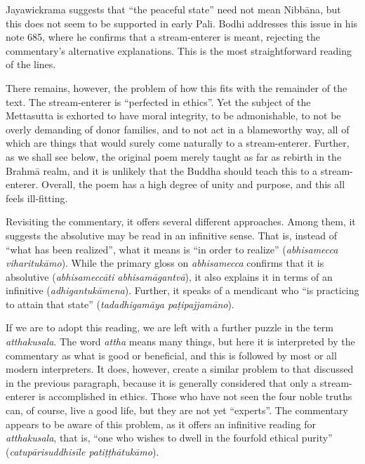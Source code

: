 \documentclass[12pt,openany]{book}%
\begin{document}
Jayawickrama suggests that “the peaceful state” need not mean \textsanskrit{Nibbāna}, but this does not seem to be supported in early Pali. Bodhi addresses this issue in his note 685, where he confirms that a stream-enterer is meant, rejecting the commentary’s alternative explanations. This is the most straightforward reading of the lines.

There remains, however, the problem of how this fits with the remainder of the text. The stream-enterer is “perfected in ethics”. Yet the subject of the Mettasutta is exhorted to have moral integrity, to be admonishable, to not be overly demanding of donor families, and to not act in a blameworthy way, all of which are things that would surely come naturally to a stream-enterer. Further, as we shall see below, the original poem merely taught as far as rebirth in the \textsanskrit{Brahmā} realm, and it is unlikely that the Buddha should teach this to a stream-enterer. Overall, the poem has a high degree of unity and purpose, and this all feels ill-fitting.

Revisiting the commentary, it offers several different approaches. Among them, it suggests the absolutive may be read in an infinitive sense. That is, instead of “what has been realized”, what it means is “in order to realize” (\textit{abhisamecca \textsanskrit{viharitukāmo}}). While the primary gloss on \textit{abhisamecca} confirms that it is absolutive (\textit{\textsanskrit{abhisameccāti} \textsanskrit{abhisamāgantvā}}), it also explains it in terms of an infinitive (\textit{\textsanskrit{adhigantukāmena}}). Further, it speaks of a mendicant who “is practicing to attain that state” (\textit{\textsanskrit{tadadhigamāya} \textsanskrit{paṭipajjamāno}}).

If we are to adopt this reading, we are left with a further puzzle in the term \textit{atthakusala}. The word \textit{attha} means many things, but here it is interpreted by the commentary as what is good or beneficial, and this is followed by most or all modern interpreters. It does, however, create a similar problem to that discussed in the previous paragraph, because it is generally considered that only a stream-enterer is accomplished in ethics. Those who have not seen the four noble truths can, of course, live a good life, but they are not yet “experts”. The commentary appears to be aware of this problem, as it offers an infinitive reading for \textit{atthakusala}, that is, “one who wishes to dwell in the fourfold ethical purity” (\textit{\textsanskrit{catupārisuddhisīle} \textsanskrit{patiṭṭhātukāmo}}).
\end{document}
